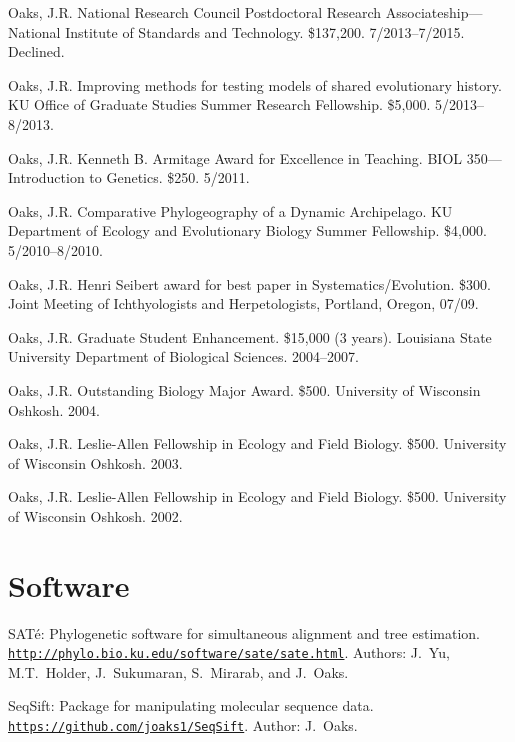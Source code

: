\myHangIndent
Oaks, J.R.
National Research Council Postdoctoral Research Associateship---National
Institute of Standards and Technology.
\$137,200.
7/2013--7/2015.
Declined.

\myHangIndent
Oaks, J.R.
Improving methods for testing models of shared evolutionary history.
KU Office of Graduate Studies Summer Research Fellowship.
\$5,000.
5/2013--8/2013.

\myHangIndent
Oaks, J.R.
Kenneth B. Armitage Award for Excellence in Teaching.
BIOL 350---Introduction to Genetics.
\$250.
5/2011.


\myHangIndent
Oaks, J.R.
Comparative Phylogeography of a Dynamic Archipelago.
KU Department of Ecology and Evolutionary Biology Summer Fellowship.
\$4,000.
5/2010--8/2010.

\myHangIndent
Oaks, J.R.
Henri Seibert award for best paper in Systematics/Evolution.
\$300.
Joint Meeting of Ichthyologists and Herpetologists, Portland, Oregon, 07/09.

\myHangIndent
Oaks, J.R.
Graduate Student Enhancement.
\$15,000 (3 years).
Louisiana State University Department of Biological Sciences.
2004--2007.

\myHangIndent
Oaks, J.R.
Outstanding Biology Major Award.
\$500.
University of Wisconsin Oshkosh.
2004.

\myHangIndent
Oaks, J.R.
Leslie-Allen Fellowship in Ecology and Field Biology.
\$500.
University of Wisconsin Oshkosh.
2003.

\myHangIndent
Oaks, J.R.
Leslie-Allen Fellowship in Ecology and Field Biology.
\$500.
University of Wisconsin Oshkosh.
2002.

\section*{Software}
\myHangIndent
{SAT}\'{e}: Phylogenetic software for simultaneous alignment and tree
estimation.
\href{http://phylo.bio.ku.edu/software/sate/sate.html}
{\tt http://phylo.bio.ku.edu/software/sate/sate.html}.
Authors: J.\ Yu, M.T.\ Holder, J.\ Sukumaran, S.\ Mirarab, and J.\ Oaks.

\myHangIndent
SeqSift: Package for manipulating molecular sequence data.
\href{https://github.com/joaks1/SeqSift}{\tt https://github.com/joaks1/SeqSift}.
Author: J.\ Oaks.

